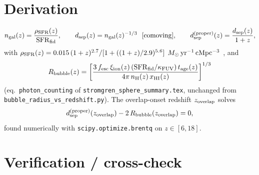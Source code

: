 \documentclass[11pt,a4paper]{article}
\newcommand{\nH}{n_{\rm H}}
\newcommand{\Msun}{\,M_\odot}
\begin{document}
\section{Derivation}
\label{sec:derivation}

\begin{equation}
  n_{\rm gal}(z) = \frac{\rho_{\rm SFR}(z)}{\mathrm{SFR}_{\rm fid}}, \qquad
  d_{\rm sep}(z) = n_{\rm gal}(z)^{-1/3} \ \ \text{[comoving]}, \qquad
  d_{\rm sep}^{\rm (proper)}(z) = \frac{d_{\rm sep}(z)}{1+z},
  \label{eq:dsep}
\end{equation}
with $\rho_{\rm SFR}(z)=0.015\,(1+z)^{2.7}/[1+((1+z)/2.9)^{5.6}]\;\Msun\,{\rm yr^{-1}\,cMpc^{-3}}$
\citep{MadauDickinson2014}, and
\begin{equation}
  R_{\rm bubble}(z) = \left[\frac{3\,f_{\rm esc}\,\xi_{\rm ion}(z)\,(\mathrm{SFR}_{\rm fid}/\kappa_{\rm FUV})\,
  t_{\rm age}(z)}{4\pi\,\nH(z)\,x_{\rm HI}(z)}\right]^{1/3}
  \label{eq:Rbubble}
\end{equation}
(eq.~\texttt{photon\_counting} of \texttt{stromgren\_sphere\_summary.tex}, unchanged from
\texttt{bubble\_radius\_vs\_redshift.py}). The overlap-onset redshift $z_{\rm overlap}$ solves
\begin{equation}
  d_{\rm sep}^{\rm (proper)}(z_{\rm overlap}) - 2\,R_{\rm bubble}(z_{\rm overlap}) = 0,
  \label{eq:overlap}
\end{equation}
found numerically with \texttt{scipy.optimize.brentq} on $z\in[6,18]$.

\section{Verification / cross-check}
\label{sec:verification}
\end{document}
